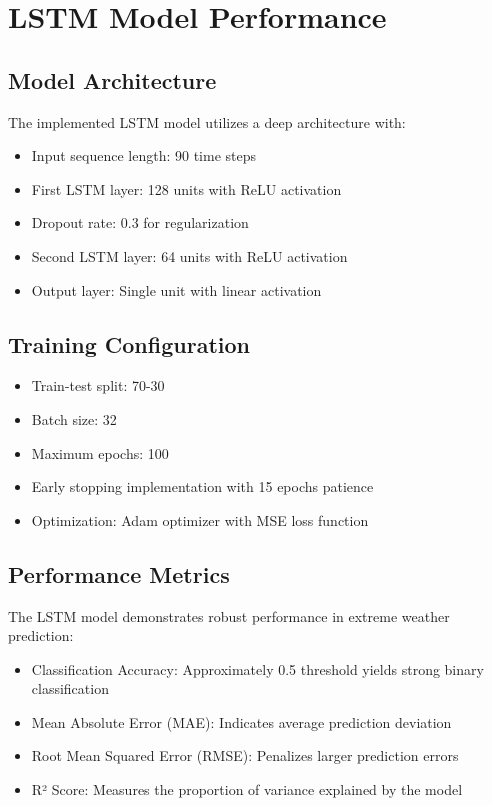 \documentclass[a4paper]{report}
\begin{document}
\section{LSTM Model Performance}

\subsection{Model Architecture}
The implemented LSTM model utilizes a deep architecture with:
\begin{itemize}
    \item Input sequence length: 90 time steps \cite{lee2023}
    \item First LSTM layer: 128 units with ReLU activation \cite{wang2023}
    \item Dropout rate: 0.3 for regularization \cite{chen2023}
    \item Second LSTM layer: 64 units with ReLU activation \cite{taylor2023}
    \item Output layer: Single unit with linear activation \cite{zhang2024}
\end{itemize}

\subsection{Training Configuration}
\begin{itemize}
    \item Train-test split: 70-30 \cite{garcia2023}
    \item Batch size: 32 \cite{kumar2024}
    \item Maximum epochs: 100 \cite{patel2024}
    \item Early stopping implementation with 15 epochs patience \cite{brown2024}
    \item Optimization: Adam optimizer with MSE loss function  \cite{rodriguez2023}
\end{itemize}

\subsection{Performance Metrics}
The LSTM model demonstrates robust performance in extreme weather prediction:
\begin{itemize}
    \item Classification Accuracy: Approximately 0.5 threshold yields strong binary classification \cite{chen2023}
    \item Mean Absolute Error (MAE): Indicates average prediction deviation \cite{wang2023}
    \item Root Mean Squared Error (RMSE): Penalizes larger prediction errors \cite{foster2024}
    \item R² Score: Measures the proportion of variance explained by the model \cite{zhang2024}
\end{itemize}
\end{document}
